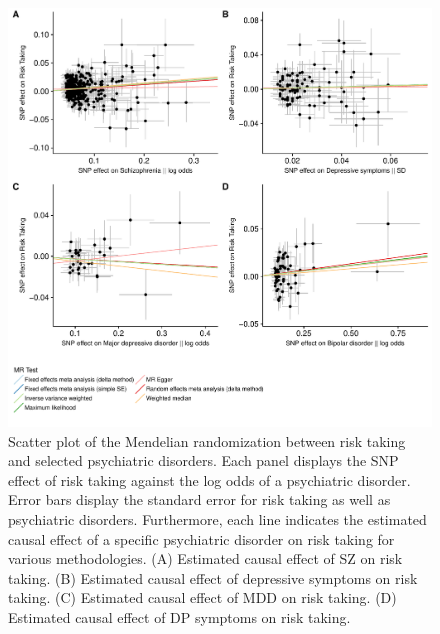 \begin{figure}[htpb]
  \centering
  \includegraphics[width=0.7\linewidth]{ukb_psychiatric/figures/mr_risk.pdf}
  \caption[Scatter Plot of the Causal Effects on Risk Taking]{
    Scatter plot of the Mendelian randomization between risk taking and selected psychiatric disorders.
    Each panel displays the SNP effect of risk taking against the log odds of a psychiatric disorder.
    Error bars display the standard error for risk taking as well as psychiatric disorders.
    Furthermore, each line indicates the estimated causal effect of a specific psychiatric disorder on risk taking for various methodologies.
    (A) Estimated causal effect of SZ on risk taking.
    (B) Estimated causal effect of depressive symptoms on risk taking.
    (C) Estimated causal effect of MDD on risk taking.
    (D) Estimated causal effect of DP symptoms on risk taking.
  }\label{fig:mr_risk}
\end{figure}

\resizebox{1\linewidth}{!}{} 

